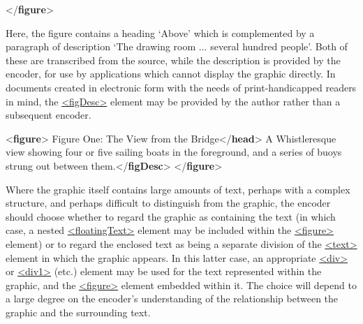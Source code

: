 \begin{shaded}
{</\textbf{figure}>}\end{shaded}\egroup\par \noindent    Here, the figure contains a heading ‘Above’ which is complemented by a paragraph of description ‘The drawing room ... several hundred people’. Both of these are transcribed from the source, while the description is provided by the encoder, for use by applications which cannot display the graphic directly. In documents created in electronic form with the needs of print-handicapped readers in mind, the \hyperref[TEI.figDesc]{<figDesc>} element may be provided by the author rather than a subsequent encoder. \par\bgroup{}\exampleFont \begin{shaded}\noindent\mbox{}{<\textbf{figure}>}\mbox{}\newline 
{}\mbox{}\newline 
{}Figure One: The View from the Bridge{</\textbf{head}>}\mbox{}\newline 
{}A Whistleresque view showing four or five sailing boats in\mbox{}\newline 
\hspace*{1em}\hspace*{1em} the foreground, and a series of buoys strung out between\mbox{}\newline 
\hspace*{1em}\hspace*{1em} them.{</\textbf{figDesc}>}\mbox{}\newline 
{</\textbf{figure}>}\end{shaded}\egroup\par \par
Where the graphic itself contains large amounts of text, perhaps with a complex structure, and perhaps difficult to distinguish from the graphic, the encoder should choose whether to regard the graphic as containing the text (in which case, a nested \hyperref[TEI.floatingText]{<floatingText>} element may be included within the \hyperref[TEI.figure]{<figure>} element) or to regard the enclosed text as being a separate division of the \hyperref[TEI.text]{<text>} element in which the graphic appears. In this latter case, an appropriate \hyperref[TEI.div]{<div>} or \hyperref[TEI.div1]{<div1>} (etc.) element may be used for the text represented within the graphic, and the \hyperref[TEI.figure]{<figure>} element embedded within it. The choice will depend to a large degree on the encoder's understanding of the relationship between the graphic and the surrounding text.\par
